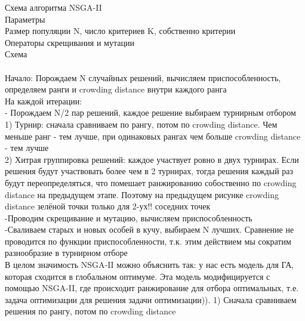 Схема алгоритма NSGA-II\\
Параметры\\
Размер популяции N, число критериев K, собственно критерии\\
Операторы скрещивания и мутации\\
Схема\\
\\Начало: Порождаем N случайных решений, вычисляем приспособленность,
определяем ранги и crowding distance внутри каждого ранга\\
На каждой итерации:\\
- Порождаем N/2 пар решений, каждое решение выбираем турнирным отбором\\
1) Турнир: сначала сравниваем по рангу, потом по crowding distance. Чем меньше ранг - тем лучше, при одинаковых рангах чем больше crowding distance - тем лучше\\
2) Хитрая группировка решений: каждое участвует ровно в двух турнирах. Если решения будут участвовать более чем в 2 турнирах, тогда решения каждый раз будут переопределяться, что помешает ранжированию собоственно по crowding distance на предыдущем этапе. Поэтому на предыдущем рисунке crowding distance зелёной точки только для 2-ух!! соседних точек\\
-Проводим скрещивание и мутацию, вычисляем приспособленность\\
-Сваливаем старых и новых особей в кучу, выбираем N лучших. Сравнение не проводится по функции приспособленности, т.к. этим действием мы сократим разнообразие в турнирном отборе\\

 В целом значимость NSGA-II можно объяснить так: у нас есть модель для ГА, которая сходится в глобальном оптимуме. Эта модель модифицируется с помощью NSGA-II, где происходит ранжирование для отбора оптимальных, т.е. задача оптимизации для решения задачи оптимизации)).
1) Сначала сравниваем решения по рангу, потом по crowding distance
